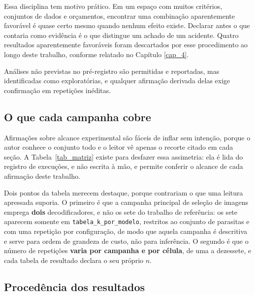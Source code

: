 Essa disciplina tem motivo prático. Em um espaço com muitos critérios, conjuntos de dados e orçamentos, encontrar uma combinação aparentemente favorável é quase certo mesmo quando nenhum efeito existe. Declarar antes o que contaria como evidência é o que distingue um achado de um acidente. Quatro resultados aparentemente favoráveis foram descartados por esse procedimento ao longo deste trabalho, conforme relatado no Capítulo \ref{cap_4}.

Análises não previstas no pré-registro são permitidas e reportadas, mas identificadas como exploratórias, e qualquer afirmação derivada delas exige confirmação em repetições inéditas.

\subsection{O que cada campanha cobre}
\label{sec_matriz}

Afirmações sobre alcance experimental são fáceis de inflar sem intenção, porque o autor conhece o conjunto todo e o leitor vê apenas o recorte citado em cada seção. A Tabela~\ref{tab_matriz} existe para desfazer essa assimetria: ela é lida do registro de execuções, e não escrita à mão, e permite conferir o alcance de cada afirmação deste trabalho.

\begin{table}[htb]
\centering
\caption{As campanhas experimentais e o que cada uma cobre.}
\label{tab_matriz}

\end{table}



Dois pontos da tabela merecem destaque, porque contrariam o que uma leitura apressada suporia. O primeiro é que a campanha principal de seleção de imagens emprega \textbf{dois} decodificadores, e não os sete do trabalho de referência: os sete aparecem somente em \texttt{tabela\_k\_por\_modelo}, restritos ao conjunto de parasitas e com uma repetição por configuração, de modo que aquela campanha é descritiva e serve para ordem de grandeza de custo, não para inferência. O segundo é que o número de repetições \textbf{varia por campanha e por célula}, de uma a dezessete, e cada tabela de resultado declara o seu próprio $n$.

\subsection{Procedência dos resultados}

